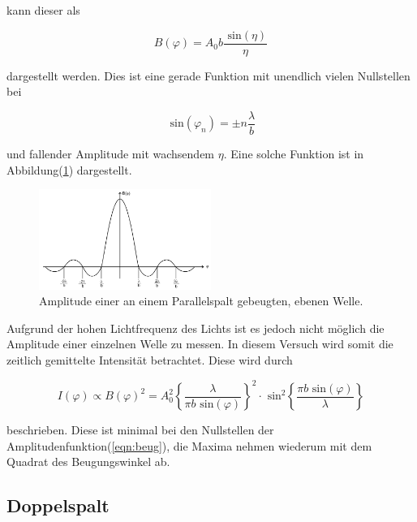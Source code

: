         \noindent kann dieser als 

        \begin{equation*}
            B(\varphi) = A_0 b \frac{\text{ sin}(\eta)}{\eta}
        \end{equation*}

        \noindent dargestellt werden. Dies ist eine gerade Funktion mit unendlich vielen Nullstellen bei 

        \begin{equation*}
            \text{ sin}(\varphi_n) = \pm n \frac{\lambda}{b}
        \end{equation*}

        \noindent und fallender Amplitude mit wachsendem $\eta$. Eine solche Funktion ist in Abbildung(\ref{img:Amplitude}) dargestellt.

        \begin{figure}[ht]
            \centering
            \includegraphics[width=0.5\textwidth]{latex/images/Amplitude.PNG}
            \caption{Amplitude einer an einem Parallelspalt gebeugten, ebenen Welle\protect \cite{V406}.}
            \label{img:Amplitude}
        \end{figure}

        \noindent Aufgrund der hohen Lichtfrequenz des Lichts ist es jedoch nicht möglich die Amplitude einer einzelnen Welle zu messen. 
        In diesem Versuch wird somit die zeitlich gemittelte Intensität betrachtet. Diese wird durch 

        \begin{equation}
            I(\varphi) \propto B(\varphi)^2 = A_0^2 \left\{ \frac{\lambda}{\pi b \text{ sin}(\varphi)} \right\}^2 \cdot \text{ sin}^2 
            \left\{\frac{\pi b \text{ sin}(\varphi)}{\lambda} \right\}
            \label{eqn:einzel}
        \end{equation}

        \noindent beschrieben. Diese ist minimal bei den Nullstellen der Amplitudenfunktion(\ref{eqn:beug}), die Maxima nehmen wiederum 
        mit dem Quadrat des Beugungswinkel ab.

    \subsection{Doppelspalt}

